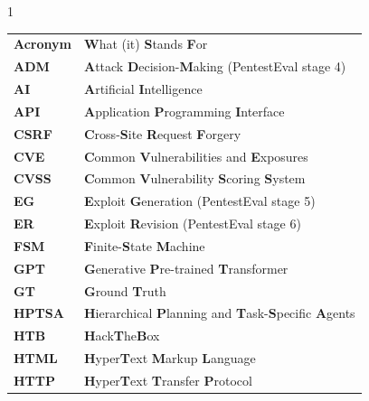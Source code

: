 
\begin{spacing}{1}
	\begin{tabular}{ll}
		\textbf{Acronym} & \textbf{W}hat (it) \textbf{S}tands \textbf{F}or                                             \\[0.5em]
		\textbf{ADM}     & \textbf{A}ttack \textbf{D}ecision-\textbf{M}aking (PentestEval stage 4)                     \\
		\textbf{AI}      & \textbf{A}rtificial \textbf{I}ntelligence                                                   \\
		\textbf{API}     & \textbf{A}pplication \textbf{P}rogramming \textbf{I}nterface                                \\
		\textbf{CSRF}    & \textbf{C}ross-\textbf{S}ite \textbf{R}equest \textbf{F}orgery                              \\
		\textbf{CVE}     & \textbf{C}ommon \textbf{V}ulnerabilities and \textbf{E}xposures                             \\
		\textbf{CVSS}    & \textbf{C}ommon \textbf{V}ulnerability \textbf{S}coring \textbf{S}ystem                     \\
		\textbf{EG}      & \textbf{E}xploit \textbf{G}eneration (PentestEval stage 5)                                  \\
		\textbf{ER}      & \textbf{E}xploit \textbf{R}evision (PentestEval stage 6)                                    \\
		\textbf{FSM}     & \textbf{F}inite-\textbf{S}tate \textbf{M}achine                                             \\
		\textbf{GPT}     & \textbf{G}enerative \textbf{P}re-trained \textbf{T}ransformer                               \\
		\textbf{GT}      & \textbf{G}round \textbf{T}ruth                                                              \\
		\textbf{HPTSA}   & \textbf{H}ierarchical \textbf{P}lanning and \textbf{T}ask-\textbf{S}pecific \textbf{A}gents \\
		\textbf{HTB}     & \textbf{H}ack\textbf{T}he\textbf{B}ox                                                       \\
		\textbf{HTML}    & \textbf{H}yper\textbf{T}ext \textbf{M}arkup \textbf{L}anguage                               \\
		\textbf{HTTP}    & \textbf{H}yper\textbf{T}ext \textbf{T}ransfer \textbf{P}rotocol                             \\

\end{tabular}
\end{spacing}
